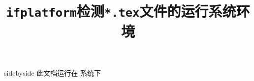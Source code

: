 \documentclass{ctexart}
\title{\texttt{ifplatform}检测\texttt{*.tex}文件的运行系统环境}
\begin{document}
	
	\maketitle
	
	\begin{tcblisting}{sidebyside}
		此文档运行在
		\ifwindows
		\windowsname
		\fi
		\iflinux
		\linuxname
		\fi
		\ifmacosx
		\macosxname
		\fi
		\ifcygwin
		\cygwinname
		\fi
		系统下
	\end{tcblisting}
	
\end{document}
